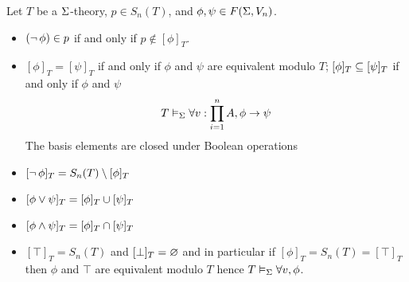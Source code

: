 \begin{prop}
    Let $T$ be a $\Sigma$-theory, $p \in S_n(T)$, and $\phi, \psi \in F(\Sigma,V_n)$.
    \begin{itemize}
        \item $(\neg\, \phi) \in p$ if and only if $p \notin [\phi]_T$.
        \item $[\phi]_T = [\psi]_T$ if and only if $\phi$ and $\psi$ are 
            equivalent modulo $T$; $[\phi]_T \subseteq [\psi]_T$ if and only if
            $\phi$ and $\psi$
            \[
                T \vDash_{\Sigma} \forall v : \prod_{i = 1}^n A, \phi \to \psi
            \]
        The basis elements are closed under Boolean operations
        \item $[\neg\, \phi]_T = S_n(T) \setminus [\phi]_T$
        \item $[\phi \lor \psi]_T = [\phi]_T \cup [\psi]_T$
        \item $[\phi \land \psi]_T = [\phi]_T \cap [\psi]_T$
        \item $[\top]_T = S_n(T)$ and $[\bot]_T = \varnothing$ and
            in particular if $[\phi]_T = S_n(T) = [\top]_T$ then 
            $\phi$ and $\top$ are equivalent modulo $T$ hence
            $T \vDash_{\Sigma} \forall v, \phi$.
    \end{itemize}
\end{prop}
